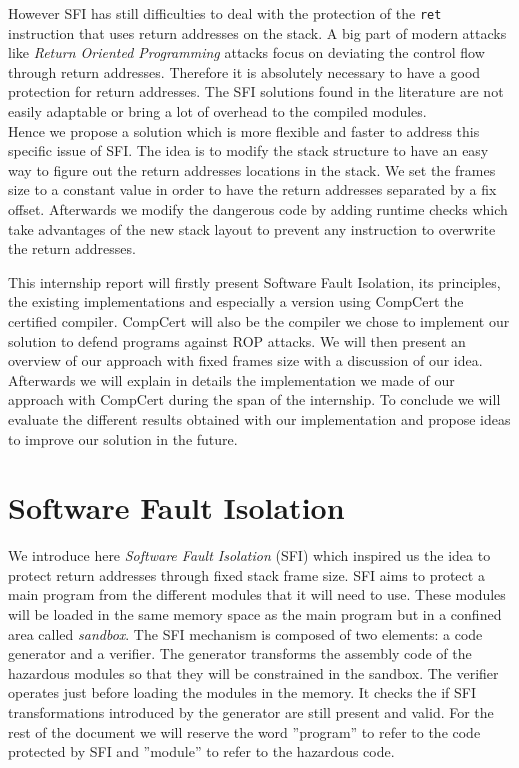 \documentclass[11pt]{sdm}
\begin{document}
However SFI has still difficulties to deal with the protection of the \texttt{ret} instruction that uses return addresses on the stack. A big part of modern attacks like \textit{Return Oriented Programming} attacks focus on deviating the control flow through return addresses. Therefore it is absolutely necessary to have a good protection for return addresses. The SFI solutions found in the literature are not easily adaptable or bring a lot of overhead to the compiled modules. \\
Hence we propose a solution which is more flexible and faster to address this specific issue of SFI.
The idea is to modify the stack structure to have an easy way to figure out the return addresses locations in the stack.
We set the frames size to a constant value in order to have the return addresses separated by a fix offset. Afterwards we modify the dangerous code by adding runtime checks  which take advantages of the new stack layout to prevent any instruction to overwrite the return addresses. 

This internship report will firstly present Software Fault Isolation, its principles, the existing implementations and especially a version using CompCert the certified compiler. CompCert will also be the compiler we chose to implement our solution to defend programs against ROP attacks. We will then present an overview of our approach with fixed frames size with a discussion of our idea. Afterwards we will explain in details the implementation we made of our approach with CompCert during the span of the internship. To conclude we will evaluate the different results obtained with our implementation and propose ideas to improve our solution in the future.



\newpage
\section{Software Fault Isolation}
\label{sec:sfi}

	We introduce here \textit{Software Fault Isolation} (SFI) which inspired us the idea to protect return addresses through fixed stack frame size. SFI aims to protect a main program from the different modules that it will need to use. These modules will be loaded in the same memory space as the main program but in a confined area called \textit{sandbox}. The SFI mechanism is composed of two elements: a code generator and a verifier. The generator transforms the assembly code of the hazardous modules so that they will be constrained in the sandbox. The verifier operates just before loading the modules in the memory. It checks the if SFI transformations introduced by the generator are still present and valid. For the rest of the document we will reserve the word ''program'' to refer to the code protected by SFI and ''module'' to refer to the hazardous code.
\end{document}
